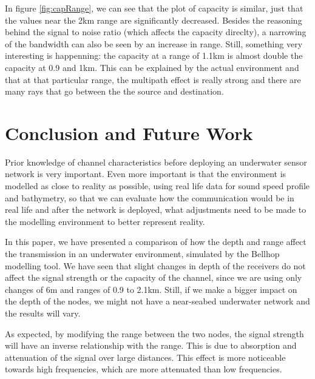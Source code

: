\documentclass[a4paper]{IEEEtran}
\begin{document}
In figure \ref{fig:capRange}, we can see that the plot of capacity is
similar, just that the values near the 2km range are significantly
decreased. Besides the reasoning behind the signal to noise ratio
(which affects the capacity direclty), a narrowing of the bandwidth
can also be seen by an increase in range. Still, something very
interesting is happenning: the capacity at a range of 1.1km is almost
double the capacity at 0.9 and 1km. This can be explained by the
actual environment and that at that particular range, the multipath
effect is really strong and there are many rays that go between the
the source and destination.

\section{Conclusion and Future Work}

Prior knowledge of channel characteristics before deploying an
underwater sensor network is very important. Even more important is
that the environment is modelled as close to reality as possible,
using real life data for sound speed profile and bathymetry, so that
we can evaluate how the communication would be in real life and after
the network is deployed, what adjustments need to be made to the
modelling environment to better represent reality. 

In this paper, we have presented a comparison of how the depth and
range affect the transmission in an underwater environment, simulated
by the Bellhop modelling tool. We have seen that slight changes in depth of
the receivers do not affect the signal strength or the capacity of the
channel, since we are using only changes of 6m and ranges of 0.9 to
2.1km. Still, if we make a bigger impact on the depth of the nodes, we
might not have a near-seabed underwater network and the results will
vary.

As expected, by modifying the range between the two nodes, the signal
strength will have an inverse relationship with the range. This is due
to absorption and attenuation of the signal over large distances. This
effect is more noticeable towards high frequencies, which are more
attenuated than low frequencies.
\end{document}
